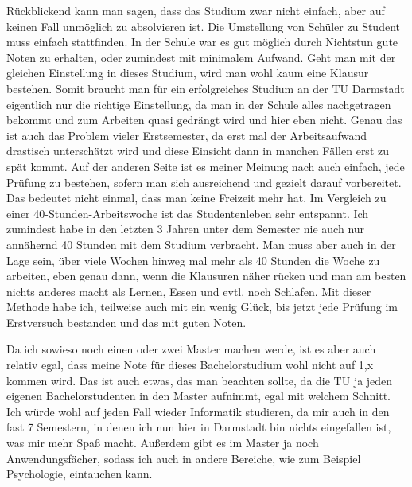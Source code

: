 {    Rückblickend kann man sagen, dass das Studium zwar nicht einfach, aber auf keinen Fall unmöglich zu absolvieren ist. Die Umstellung von Schüler zu Student muss einfach stattfinden. In der Schule war es gut möglich durch Nichtstun gute Noten zu erhalten, oder zumindest mit minimalem Aufwand. Geht man mit der gleichen Einstellung in dieses Studium, wird man wohl kaum eine Klausur bestehen. Somit braucht man für ein erfolgreiches Studium an der TU Darmstadt eigentlich nur die richtige Einstellung, da man in der Schule alles nachgetragen bekommt und zum Arbeiten quasi gedrängt wird und hier eben nicht. Genau das ist auch das Problem vieler Erstsemester, da erst mal der Arbeitsaufwand drastisch unterschätzt wird und diese Einsicht dann in manchen Fällen erst zu spät kommt. Auf der anderen Seite ist es meiner Meinung nach auch einfach, jede Prüfung zu bestehen, sofern man sich ausreichend und gezielt darauf vorbereitet. Das bedeutet nicht einmal, dass man keine Freizeit mehr hat. Im Vergleich zu einer 40-Stunden-Arbeitswoche ist das Studentenleben sehr entspannt. Ich zumindest habe in den letzten 3 Jahren unter dem Semester nie auch nur annähernd 40 Stunden mit dem Studium verbracht. Man muss aber auch in der Lage sein, über viele Wochen hinweg mal mehr als 40 Stunden die Woche zu arbeiten, eben genau dann, wenn die Klausuren näher rücken und man am besten nichts anderes macht als Lernen, Essen und evtl. noch Schlafen. Mit dieser Methode habe ich, teilweise auch mit ein wenig Glück, bis jetzt jede Prüfung im Erstversuch bestanden und das mit guten Noten.

    Da ich sowieso noch einen oder zwei Master machen werde, ist es aber auch relativ egal, dass meine Note für dieses Bachelorstudium wohl nicht auf 1,x kommen wird. Das ist auch etwas, das man beachten sollte, da die TU ja jeden eigenen Bachelorstudenten in den Master aufnimmt, egal mit welchem Schnitt. Ich würde wohl auf jeden Fall wieder Informatik studieren, da mir auch in den fast 7 Semestern, in denen ich nun hier in Darmstadt bin nichts eingefallen ist, was mir mehr Spaß macht. Außerdem gibt es im Master ja noch Anwendungsfächer, sodass ich auch in andere Bereiche, wie zum Beispiel Psychologie, eintauchen kann.

}
{}

\vfill
{}

\newpage
